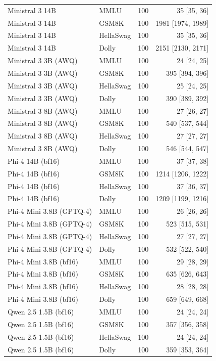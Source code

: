 \begin{longtable}{@{}l l r r@{}}
Ministral 3 14B & MMLU & 100 & 35 [35, 36] \\
Ministral 3 14B & GSM8K & 100 & 1981 [1974, 1989] \\
Ministral 3 14B & HellaSwag & 100 & 35 [35, 36] \\
Ministral 3 14B & Dolly & 100 & 2151 [2130, 2171] \\
Ministral 3 3B (AWQ) & MMLU & 100 & 24 [24, 25] \\
Ministral 3 3B (AWQ) & GSM8K & 100 & 395 [394, 396] \\
Ministral 3 3B (AWQ) & HellaSwag & 100 & 25 [24, 25] \\
Ministral 3 3B (AWQ) & Dolly & 100 & 390 [389, 392] \\
Ministral 3 8B (AWQ) & MMLU & 100 & 27 [26, 27] \\
Ministral 3 8B (AWQ) & GSM8K & 100 & 540 [537, 544] \\
Ministral 3 8B (AWQ) & HellaSwag & 100 & 27 [27, 27] \\
Ministral 3 8B (AWQ) & Dolly & 100 & 546 [544, 547] \\
Phi-4 14B (bf16) & MMLU & 100 & 37 [37, 38] \\
Phi-4 14B (bf16) & GSM8K & 100 & 1214 [1206, 1222] \\
Phi-4 14B (bf16) & HellaSwag & 100 & 37 [36, 37] \\
Phi-4 14B (bf16) & Dolly & 100 & 1209 [1199, 1216] \\
Phi-4 Mini 3.8B (GPTQ-4) & MMLU & 100 & 26 [26, 26] \\
Phi-4 Mini 3.8B (GPTQ-4) & GSM8K & 100 & 523 [515, 531] \\
Phi-4 Mini 3.8B (GPTQ-4) & HellaSwag & 100 & 27 [27, 27] \\
Phi-4 Mini 3.8B (GPTQ-4) & Dolly & 100 & 532 [522, 540] \\
Phi-4 Mini 3.8B (bf16) & MMLU & 100 & 29 [28, 29] \\
Phi-4 Mini 3.8B (bf16) & GSM8K & 100 & 635 [626, 643] \\
Phi-4 Mini 3.8B (bf16) & HellaSwag & 100 & 28 [28, 28] \\
Phi-4 Mini 3.8B (bf16) & Dolly & 100 & 659 [649, 668] \\
Qwen 2.5 1.5B (bf16) & MMLU & 100 & 24 [24, 24] \\
Qwen 2.5 1.5B (bf16) & GSM8K & 100 & 357 [356, 358] \\
Qwen 2.5 1.5B (bf16) & HellaSwag & 100 & 24 [24, 24] \\
Qwen 2.5 1.5B (bf16) & Dolly & 100 & 359 [353, 364] \\

\end{longtable}
